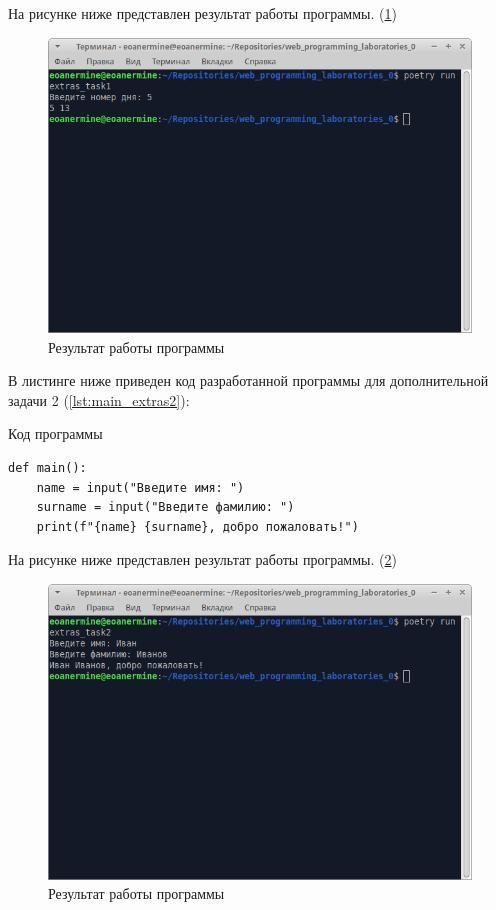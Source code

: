 \documentclass[14pt]{extarticle}
\newenvironment{code}{\captionsetup{type=listing, belowskip=-14pt plus 3pt minus 0pt}}{}
\begin{document}
На рисунке ниже представлен результат работы программы. (\ref{img:main_extras1})

\begin{figure}[H]
    \centering
    \includegraphics[width=1.0\linewidth]{main_extras1.png}
    \caption{Результат работы программы\label{img:main_extras1}}
\end{figure}

В листинге ниже приведен код разработанной программы для дополнительной задачи 2 (\ref{lst:main_extras2}):

\begin{code}    
\caption{Код программы\label{lst:main_extras2}}
\begin{verbatim}
def main():
	name = input("Введите имя: ")
	surname = input("Введите фамилию: ")
	print(f"{name} {surname}, добро пожаловать!")
\end{verbatim}
\end{code}

На рисунке ниже представлен результат работы программы. (\ref{img:main_extras2})

\begin{figure}[H]
    \centering
    \includegraphics[width=1.0\linewidth]{main_extras2.png}
    \caption{Результат работы программы\label{img:main_extras2}}
\end{figure}
\end{document}
